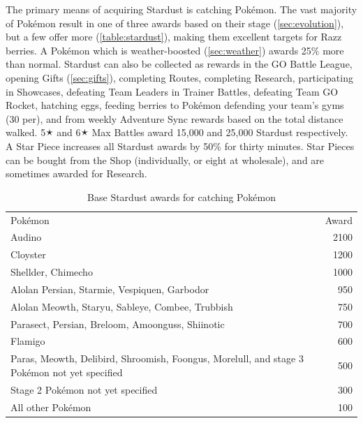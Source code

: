 The primary means of acquiring Stardust is catching Pokémon.
The vast majority of Pokémon result in one of three awards based on their stage
 (\autoref{sec:evolution}), but a few offer more (\autoref{table:stardust}),
 making them excellent targets for Razz berries.
A Pokémon which is weather-boosted (\autoref{sec:weather}) awards 25\% more than normal.
Stardust can also be collected as rewards in the GO Battle League,
  opening Gifts (\autoref{sec:gifts}),
  completing Routes,
  completing Research,
  participating in Showcases,
  defeating Team Leaders in Trainer Battles,
  defeating Team GO Rocket,
  hatching eggs,
  feeding berries to Pokémon defending your team's gyms (30 per),
  and from weekly Adventure Sync rewards based on the total distance walked.
5🟉 and 6🟉 Max Battles award 15,000 and 25,000 Stardust respectively.
A Star Piece increases all Stardust awards by 50\% for thirty minutes.
Star Pieces can be bought from the Shop (individually, or eight at wholesale), and are sometimes awarded for Research.
\begin{table}
\centering
\footnotesize
\begin{tabular}{p{}r}
Pokémon & Award \\ %
\Midrule
Audino & 2100 \\ %
\rowcolor{Gray!25}Cloyster & 1200 \\%
Shellder, Chimecho & 1000 \\%
\rowcolor{Gray!25}Alolan Persian, Starmie, Vespiquen, Garbodor & 950 \\%
Alolan Meowth, Staryu, Sableye, Combee, Trubbish & 750 \\
\rowcolor{Gray!25}Parasect, Persian, Breloom, Amoonguss, Shiinotic & 700\\%
Flamigo & 600 \\
\rowcolor{Gray!25}Paras, Meowth, Delibird, Shroomish, Foongus,\newline
Morelull, and stage 3 Pokémon not yet specified & 500\\%
Stage 2 Pokémon not yet specified & 300 \\%
\rowcolor{Gray!25}All other Pokémon & 100 \\%
\end{tabular}
\caption{Base Stardust awards for catching Pokémon\label{table:stardust}}
\end{table}
